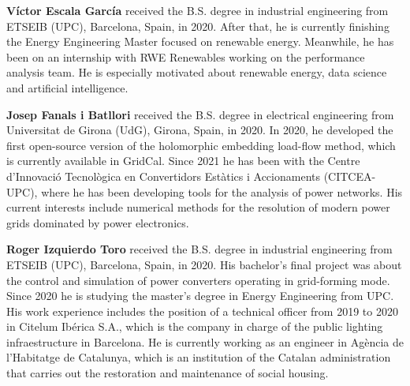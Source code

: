 \textbf{Víctor Escala García} received the B.S. degree in industrial engineering from ETSEIB (UPC), Barcelona, Spain, in 2020. After that, he is currently finishing the Energy Engineering Master focused on renewable energy. Meanwhile, he has been on an internship with RWE Renewables working on the performance analysis team. He is especially motivated about renewable energy, data science and artificial intelligence. 

\textbf{Josep Fanals i Batllori} received the B.S. degree in electrical engineering from Universitat de Girona (UdG), Girona, Spain, in 2020. In 2020, he developed the first open-source version of the holomorphic embedding load-flow method, which is currently available in GridCal. Since 2021 he has been with the Centre d'Innovació Tecnològica en Convertidors Estàtics i Accionaments (CITCEA-UPC), where he has been developing tools for the analysis of power networks. His current interests include numerical methods for the resolution of modern power grids dominated by power electronics. 

\textbf{Roger Izquierdo Toro} received the B.S. degree in industrial engineering from ETSEIB (UPC), Barcelona, Spain, in 2020. His bachelor's final project was about the control and simulation of power converters operating in grid-forming mode. Since 2020 he is studying the master's degree in Energy Engineering from UPC. His work experience includes the position of a technical officer from 2019 to 2020 in Citelum Ibérica S.A., which is the company in charge of the public lighting infraestructure in Barcelona. He is currently working as an engineer in Agència de l'Habitatge de Catalunya, which is an institution of the Catalan administration that carries out the restoration and maintenance of social housing. 
